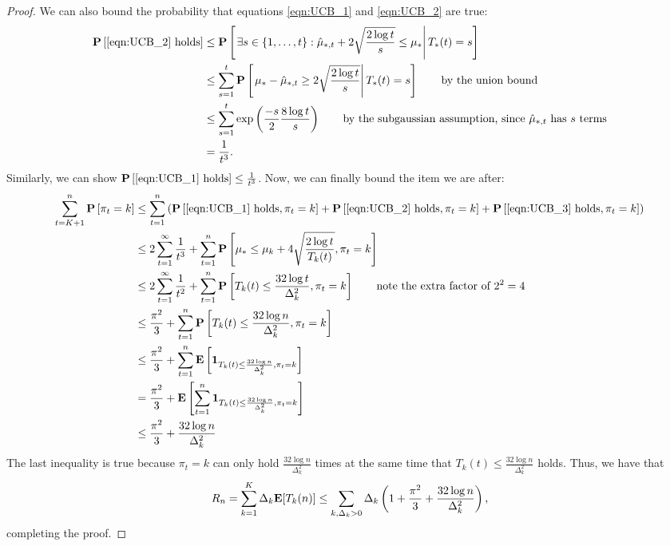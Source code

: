 \begin{proof}
We can also bound the probability that equations \eqref{eqn:UCB_1} and \eqref{eqn:UCB_2} are true:
\begin{align*}
\mathbf{P} \left[\text{\eqref{eqn:UCB_2} holds} \right] & \leq \mathbf{P} \left[ \left. \exists s \in \{1, \ldots, t\}: \hat \mu_{*, t} + 2 \sqrt{\frac{2 \log t}{s}} \leq \mu_* \right| T_*(t) = s \right] \\
&\leq \sum_{s = 1}^t \mathbf{P} \left[ \left. \mu_* - \hat \mu_{*, t} \geq 2 \sqrt{\frac{2 \log t}{s}} \right| T_*(t) = s \right] \qquad \text{by the union bound}\\
&\leq \sum_{s=1}^t \exp \left(\frac{-s}{2} \frac{8 \log t}{s}\right) \qquad \text{by the subgaussian assumption, since $\hat \mu_{*, t}$ has $s$ terms} \\
&= \frac{1}{t^3}.
\end{align*}
Similarly, we can show $\mathbf{P} \left[ \text{\eqref{eqn:UCB_1} holds}\right] \leq \frac{1}{t^3}$.  
\allowdisplaybreaks
Now, we can finally bound the item we are after: 
\begin{align*}
\sum_{t=K+1}^n \mathbf{P} \left[\pi_t = k \right] & \leq \sum_{t=1}^n \left(\mathbf{P} \left[ \text{\eqref{eqn:UCB_1} holds}, \pi_t = k\right] + \mathbf{P}\left[ \text{\eqref{eqn:UCB_2} holds}, \pi_t = k\right] + \mathbf{P}\left[\text{\eqref{eqn:UCB_3} holds}, \pi_t = k\right] \right) \\
&\leq 2 \sum_{t=1}^\infty \frac{1}{t^3} + \sum_{t=1}^n \mathbf{P} \left[\mu_* \leq \mu_k + 4 \sqrt{\frac{2 \log t}{T_k(t)}}, \pi_t = k \right] \\
&\leq 2 \sum_{t=1}^\infty \frac{1}{t^2} + \sum_{t=1}^n \mathbf{P}\left[T_k(t) \leq \frac{32 \log t}{\Delta_k^2}, \pi_t = k \right]
\qquad \text{note the extra factor of $2^2 = 4$} \\
& \leq \frac{\pi^2}{3} + \sum_{t=1}^n \mathbf{P}\left[T_k(t) \leq \frac{32 \log n}{\Delta_k^2}, \pi_t = k \right] \\
& \leq \frac{\pi^2}{3} + \sum_{t=1}^n \mathbf{E} \left[\mathbf{1}_{T_k(t) \leq \frac{32 \log n}{\Delta^2_k}, \pi_t = k}\right] \\ 
&= \frac{\pi^2}{3} +  \mathbf{E} \left[\sum_{t=1}^n \mathbf{1}_{T_k(t) \leq \frac{32 \log n}{\Delta^2_k}, \pi_t = k}\right] \\
&\leq \frac{\pi^2}{3} + \frac{32 \log n}{\Delta_k^2} \qquad 
\end{align*}
\allowdisplaybreaks[0]
The last inequality is true because $\pi_t = k$ can only hold $\frac{32 \log n}{\Delta^2_k}$ times at the same time that $T_k(t) \leq \frac{32 \log n}{\Delta^2_k}$ holds.
Thus, we have that 
\[
R_n = \sum_{k=1}^K \Delta_k \mathbf{E} [T_k(n)] \leq \sum_{k, \Delta_k > 0} \Delta_k \left(1 + \frac{\pi^2}{3} + \frac{32 \log n}{\Delta_k^2} \right),
\]
completing the proof. 
\end{proof}

